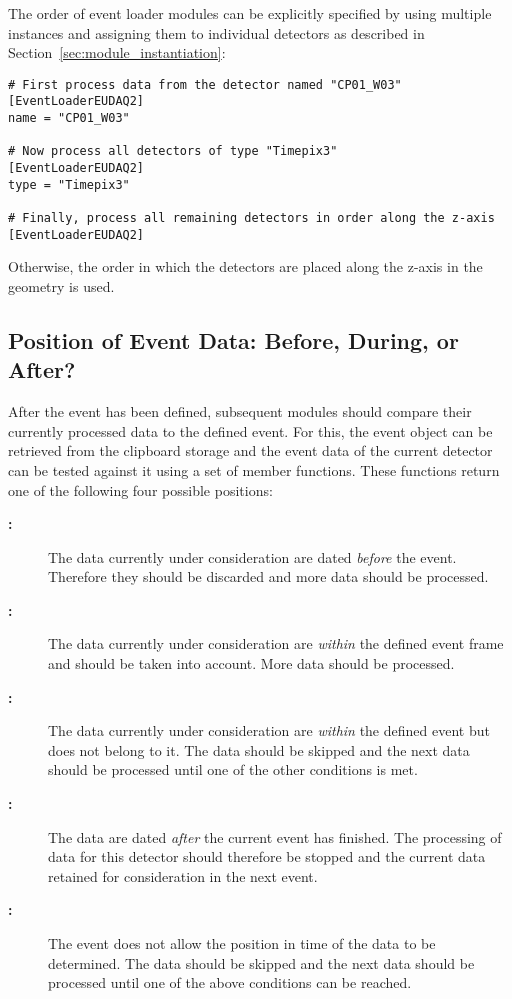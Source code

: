 The order of event loader modules can be explicitly specified by using multiple instances and assigning them to individual detectors as described in Section~\ref{sec:module_instantiation}:

\begin{verbatim}
# First process data from the detector named "CP01_W03"
[EventLoaderEUDAQ2]
name = "CP01_W03"

# Now process all detectors of type "Timepix3"
[EventLoaderEUDAQ2]
type = "Timepix3"

# Finally, process all remaining detectors in order along the z-axis
[EventLoaderEUDAQ2]
\end{verbatim}

Otherwise, the order in which the detectors are placed along the z-axis in the geometry is used.

\subsection{Position of Event Data: Before, During, or After?}

After the event has been defined, subsequent modules should compare their currently processed data to the defined event.
For this, the event object can be retrieved from the clipboard storage and the event data of the current detector can be tested against it using a set of member functions.
These functions return one of the following four possible positions:
\begin{description}
        \item[\textbf{:}] The data currently under consideration are dated \emph{before} the event. Therefore they should be discarded and more data should be processed.
        \item[\textbf{:}] The data currently under consideration are \emph{within} the defined event frame and should be taken into account. More data should be processed.
        \item[\textbf{:}] The data currently under consideration are \emph{within} the defined event but does not belong to it. The data should be skipped and the next data should be processed until one of the other conditions is met.
        \item[\textbf{:}] The data are dated \emph{after} the current event has finished. The processing of data for this detector should therefore be stopped and the current data retained for consideration in the next event.
        \item[\textbf{:}] The event does not allow the position in time of the data to be determined. The data should be skipped and the next data should be processed until one of the above conditions can be reached.
\end{description}

